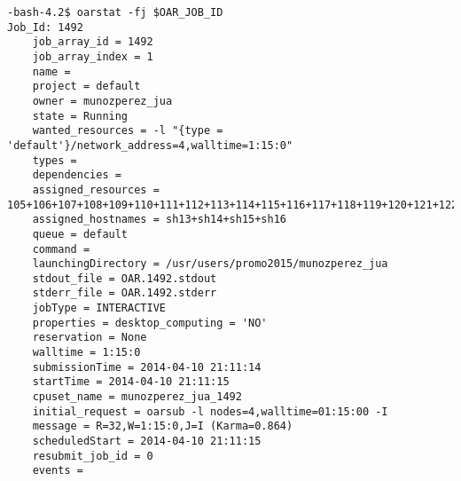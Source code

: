 \begin{verbatim}
-bash-4.2$ oarstat -fj $OAR_JOB_ID
Job_Id: 1492
    job_array_id = 1492
    job_array_index = 1
    name = 
    project = default
    owner = munozperez_jua
    state = Running
    wanted_resources = -l "{type = 'default'}/network_address=4,walltime=1:15:0" 
    types = 
    dependencies = 
    assigned_resources = 105+106+107+108+109+110+111+112+113+114+115+116+117+118+119+120+121+122+123+124+125+126+127+128+129+130+131+132+133+134+135+136
    assigned_hostnames = sh13+sh14+sh15+sh16
    queue = default
    command = 
    launchingDirectory = /usr/users/promo2015/munozperez_jua
    stdout_file = OAR.1492.stdout
    stderr_file = OAR.1492.stderr
    jobType = INTERACTIVE
    properties = desktop_computing = 'NO'
    reservation = None
    walltime = 1:15:0
    submissionTime = 2014-04-10 21:11:14
    startTime = 2014-04-10 21:11:15
    cpuset_name = munozperez_jua_1492
    initial_request = oarsub -l nodes=4,walltime=01:15:00 -I
    message = R=32,W=1:15:0,J=I (Karma=0.864)
    scheduledStart = 2014-04-10 21:11:15
    resubmit_job_id = 0
    events = 

\end{verbatim}